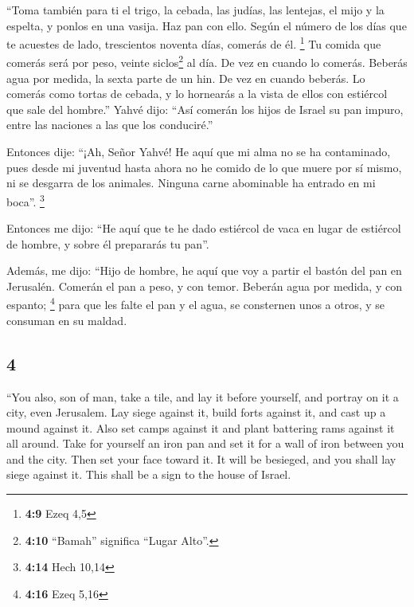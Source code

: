 \begin{paracol}{2}
 ``Toma también para ti el trigo, la cebada, las judías,
las lentejas, el mijo y la espelta, y ponlos en una vasija. Haz pan con
ello. Según el número de los días que te acuestes de lado, trescientos
noventa días, comerás de él. \footnote{\textbf{4:9} Ezeq 4,5}
 Tu comida que comerás será por peso, veinte
siclos\footnote{\textbf{4:10} ``Bamah'' significa ``Lugar Alto''.} al
día. De vez en cuando lo comerás.  Beberás agua por
medida, la sexta parte de un hin. De vez en cuando beberás.
 Lo comerás como tortas de cebada, y lo hornearás a la
vista de ellos con estiércol que sale del hombre.'' 
Yahvé dijo: ``Así comerán los hijos de Israel su pan impuro, entre las
naciones a las que los conduciré.''

 Entonces dije: ``¡Ah, Señor Yahvé! He aquí que mi alma
no se ha contaminado, pues desde mi juventud hasta ahora no he comido de
lo que muere por sí mismo, ni se desgarra de los animales. Ninguna carne
abominable ha entrado en mi boca''. \footnote{\textbf{4:14} Hech 10,14}

 Entonces me dijo: ``He aquí que te he dado estiércol de
vaca en lugar de estiércol de hombre, y sobre él prepararás tu pan''.

 Además, me dijo: ``Hijo de hombre, he aquí que voy a
partir el bastón del pan en Jerusalén. Comerán el pan a peso, y con
temor. Beberán agua por medida, y con espanto; \footnote{\textbf{4:16}
  Ezeq 5,16}  para que les falte el pan y el agua, se
consternen unos a otros, y se consuman en su maldad.

\switchcolumn
\begin{otherlanguage}{english}

\hypertarget{section-7}{%
\section{4}\label{section-7}}

 ``You also, son of man, take a tile, and lay it before
yourself, and portray on it a city, even Jerusalem.  Lay
siege against it, build forts against it, and cast up a mound against
it. Also set camps against it and plant battering rams against it all
around.  Take for yourself an iron pan and set it for a
wall of iron between you and the city. Then set your face toward it. It
will be besieged, and you shall lay siege against it. This shall be a
sign to the house of Israel.


\end{otherlanguage}
\end{paracol}
